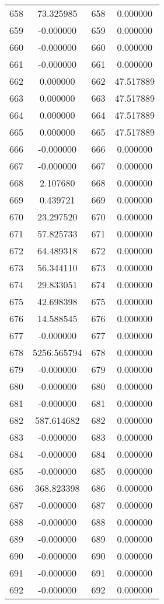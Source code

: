 \documentclass[12pt]{article}
\begin{document}
\begin{longtable}{@{}cccc@{}}
658 & 73.325985 & 658 & 0.000000 \\
659 & -0.000000 & 659 & 0.000000 \\
660 & -0.000000 & 660 & 0.000000 \\
661 & -0.000000 & 661 & 0.000000 \\
662 & 0.000000 & 662 & 47.517889 \\
663 & 0.000000 & 663 & 47.517889 \\
664 & 0.000000 & 664 & 47.517889 \\
665 & 0.000000 & 665 & 47.517889 \\
666 & -0.000000 & 666 & 0.000000 \\
667 & -0.000000 & 667 & 0.000000 \\
668 & 2.107680 & 668 & 0.000000 \\
669 & 0.439721 & 669 & 0.000000 \\
670 & 23.297520 & 670 & 0.000000 \\
671 & 57.825733 & 671 & 0.000000 \\
672 & 64.489318 & 672 & 0.000000 \\
673 & 56.344110 & 673 & 0.000000 \\
674 & 29.833051 & 674 & 0.000000 \\
675 & 42.698398 & 675 & 0.000000 \\
676 & 14.588545 & 676 & 0.000000 \\
677 & -0.000000 & 677 & 0.000000 \\
678 & 5256.565794 & 678 & 0.000000 \\
679 & -0.000000 & 679 & 0.000000 \\
680 & -0.000000 & 680 & 0.000000 \\
681 & -0.000000 & 681 & 0.000000 \\
682 & 587.614682 & 682 & 0.000000 \\
683 & -0.000000 & 683 & 0.000000 \\
684 & -0.000000 & 684 & 0.000000 \\
685 & -0.000000 & 685 & 0.000000 \\
686 & 368.823398 & 686 & 0.000000 \\
687 & -0.000000 & 687 & 0.000000 \\
688 & -0.000000 & 688 & 0.000000 \\
689 & -0.000000 & 689 & 0.000000 \\
690 & -0.000000 & 690 & 0.000000 \\
691 & -0.000000 & 691 & 0.000000 \\
692 & -0.000000 & 692 & 0.000000 \\

\end{longtable}
\end{document}
